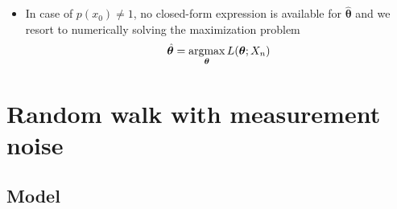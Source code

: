 \documentclass[12pt,a4paper]{article}
\begin{document}
\begin{itemize}
\begin{itemize}
\begin{figure}[t]
    {figures/fig_ar1.pdf}
    \caption{%
      Sample paths $X_{n}$ generated from \eqref{eq:model_ar1} where $x_{0}=0$, $a=0.5$, $b=1$, $V=3$ (top left)
      and the maximum likelihood estimator $\hat{\theta}(X_{n})=(\hat{a}(X_{n}), \hat{b}(X_{n}), \hat{V}(X_{n}))$ computed as \eqref{eq:MLE_ar1}. 
    } 
    \label{fig:ar1}
  \end{figure} 

  \item In case of $p(x_{0})\neq 1$,
    no closed-form expression is available for $\hat{\bm{\theta}}$
    and we resort to numerically solving the maximization problem
    \begin{equation}\nonumber%
      \hat{\bm{\theta}} = \argmax_{\bm{\theta}} L(\bm{\theta};X_{n})
    \end{equation}

  \end{itemize}

\end{itemize}

\section{Random walk with measurement noise}

\subsection{Model}
\end{document}
